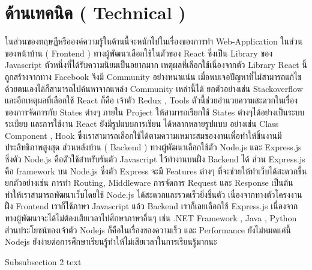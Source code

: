   
  

\section{ด้านเทคนิค ( Technical )}
ในส่วนของทฤษฏีหรือองค์ความรู้ในด้านนี้จะหนักไปในเรื่องของการทำ
Web-Application ในส่วนของหน้าบ้าน ( Frontend ) ทางผู้พัฒนาเลือกใช้ในตัวของ
React ซึ่งเป็น Library ของ Javascript ตัวหนึ่งที่ได้รับความนิยมเป็นอยากมาก เหตุผลที่เลือกใช้เนื่องจากตัว Library React นี้ถูกสร้างจากทาง Facebook 
จึงมี Community อย่างหนาแน่น  เมื่อพบเจอปัญหาที่ไม่สามารถแก้ไขด้วยตนเองได้ก็สามารถไปค้นหาจากแหล่ง Community เหล่านี้ได้ ยกตัวอย่างเช่น Stackoverflow 
และอีกเหตุผลที่เลือกใช้ React ก็คือ เจ้าตัว Redux ,  Tools ตัวนี้ช่วยอำนวยความสะดวกในเรื่องของการจัดการกับ States ต่างๆ  ภายใน Project ให้สามารถเรียกใช้ States ต่างๆได้อย่างเป็นระบบระเบียบ และการใช้งาน React ยังมีรูปแบบการเขียน
ได้หลากหลายรูปแบบ อย่างเช่น Class Component , Hook ซึ่งเราสามารถเลือกใช้ได้ตามความเหมาะสมของงานเพื่อทำให้ชิ้นงานมีประสิทธิภาพสูงสุด
ส่วนหลังบ้าน ( Backend ) ทางผู้พัฒนาเลือกใช้ตัว Node.js และ Express.js  ซึ่งตัว Node.js คือตัวใช้สำหรับรันตัว Javascript ไว้ทำงานบนฝั่ง Backend ได้  ส่วน Express.js คือ  framework บน Node.js 
ซึ่งตัว Express จะมี Features ต่างๆ  ที่จะช่วยให้ทำเว็บได้สะดวกขึ้น ยกตัวอย่างเช่น การทำ Routing, Middleware การจัดการ Request และ Response เป็นต้น  ทำให้เราสามารถพัฒนาเว็บโดยใช้ Node.js ได้สะดวกและรวดเร็วยิ่งขึ้นตัว
เนื่องจากทางตัวโครงงานฝั่ง Frontend เราก็ใช้ภาษา Javascript แล้ว Backend เราก็เลยเลือกใช้ Express.js  เนื่องจากทางผู้พัฒนาจะได้ไม่ต้องเสียเวลาไปศึกษาภาษาอื่นๆ เช่น  .NET Framework , Java , Python 
ส่วนประโยชน์ของเจ้าตัว Nodejs ก็คือในเรื่องของความเร็ว และ Performance ยังไม่หมดแค่นี้ Nodejs ยังง่ายต่อการศึกษาเรียนรู้ทำให้ไม่เสียเวลาในการเรียนรู้มากนะ 







Subsubsection 2 text

